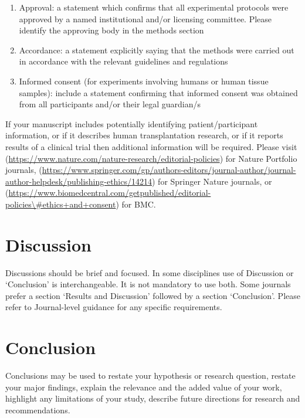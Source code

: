 \documentclass[sn-vancouver,Numbered,pdflatex]{sn-jnl}
\theoremstyle{remark}
\theoremstyle{definition}
\begin{document}
\begin{enumerate}
\def\labelenumi{\arabic{enumi}.}
\item
  Approval: a statement which confirms that all experimental protocols
  were approved by a named institutional and/or licensing committee.
  Please identify the approving body in the methods section
\item
  Accordance: a statement explicitly saying that the methods were
  carried out in accordance with the relevant guidelines and regulations
\item
  Informed consent (for experiments involving humans or human tissue
  samples): include a statement confirming that informed consent was
  obtained from all participants and/or their legal guardian/s
\end{enumerate}

If your manuscript includes potentially identifying patient/participant
information, or if it describes human transplantation research, or if it
reports results of a clinical trial then additional information will be
required. Please visit
(\url{https://www.nature.com/nature-research/editorial-policies}) for
Nature Portfolio journals,
(\url{https://www.springer.com/gp/authors-editors/journal-author/journal-author-helpdesk/publishing-ethics/14214})
for Springer Nature journals, or
(\href{https://www.biomedcentral.com/getpublished/editorial-policies\#ethics+and+consent}{https://www.biomedcentral.com/getpublished/editorial-policies\textbackslash\#ethics+and+consent})
for BMC.

\hypertarget{sec12}{%
\section{Discussion}\label{sec12}}

Discussions should be brief and focused. In some disciplines use of
Discussion or `Conclusion' is interchangeable. It is not mandatory to
use both. Some journals prefer a section `Results and Discussion'
followed by a section `Conclusion'. Please refer to Journal-level
guidance for any specific requirements.

\hypertarget{sec13}{%
\section{Conclusion}\label{sec13}}

Conclusions may be used to restate your hypothesis or research question,
restate your major findings, explain the relevance and the added value
of your work, highlight any limitations of your study, describe future
directions for research and recommendations.
\end{document}
